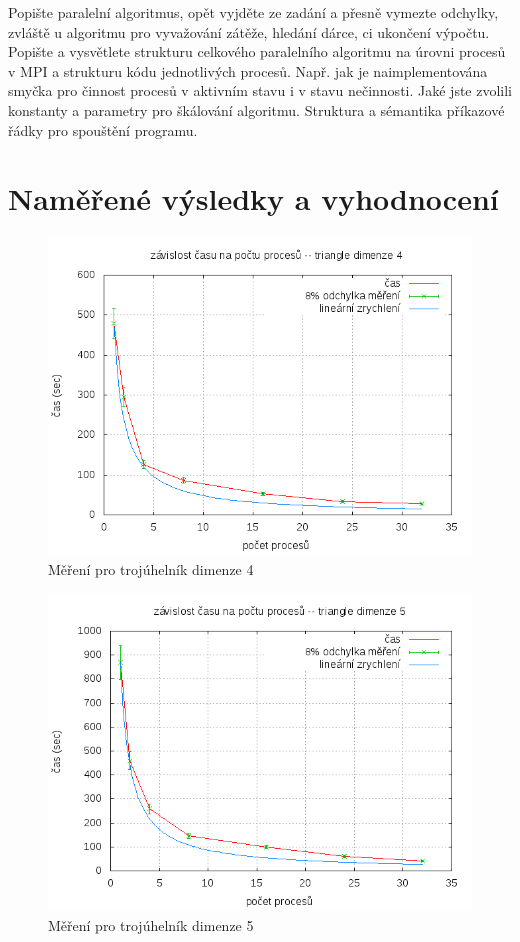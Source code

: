 \documentclass[12pt,a4paper]{article}
\begin{document}
Popište paralelní algoritmus, opět vyjděte ze zadání a přesně
vymezte odchylky, zvláště u algoritmu pro vyvažování zátěže, hledání
dárce, ci ukončení výpočtu.  Popište a vysvětlete strukturu
celkového paralelního algoritmu na úrovni procesů v MPI a strukturu
kódu jednotlivých procesů. Např. jak je naimplementována smyčka pro
činnost procesů v aktivním stavu i v stavu nečinnosti. Jaké jste
zvolili konstanty a parametry pro škálování algoritmu. Struktura a
sémantika příkazové řádky pro spouštění programu.

\section{Naměřené výsledky a vyhodnocení}

\begin{figure}[ht]
\includegraphics[width=\textwidth]{data4.png}
\caption{Měření pro trojúhelník dimenze 4}
\label{data4}
\end{figure}

\begin{figure}[ht]
\includegraphics[width=\textwidth]{data5.png}
\caption{Měření pro trojúhelník dimenze 5}
\label{data5}
\end{figure}
\end{document}
